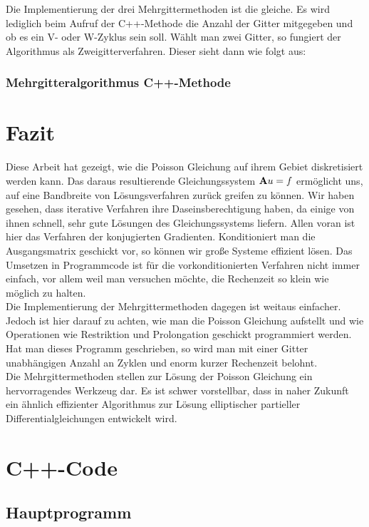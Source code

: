 Die Implementierung der drei Mehrgittermethoden ist die gleiche. Es wird lediglich beim Aufruf der C++-Methode die Anzahl der Gitter mitgegeben und ob es ein V- oder W-Zyklus sein soll. Wählt man zwei Gitter, so fungiert der Algorithmus als Zweigitterverfahren. Dieser sieht dann wie folgt aus:

\subsection{Mehrgitteralgorithmus C++-Methode}\label{s.mgm}

\chapter{Fazit}

Diese Arbeit hat gezeigt, wie die Poisson Gleichung auf ihrem Gebiet diskretisiert werden kann. Das daraus resultierende Gleichungssystem ${\textbf{A}} u = f$ ermöglicht uns, auf eine Bandbreite von Lösungsverfahren zurück greifen zu können. Wir haben gesehen, dass iterative Verfahren ihre Daseinsberechtigung haben, da einige von ihnen schnell, sehr gute Lösungen des Gleichungssystems liefern. Allen voran ist hier das Verfahren der konjugierten Gradienten. Konditioniert man die Ausgangsmatrix geschickt vor, so können wir große Systeme effizient lösen. Das Umsetzen in Programmcode ist für die vorkonditionierten Verfahren nicht immer einfach, vor allem weil man versuchen möchte, die Rechenzeit so klein wie möglich zu halten.\\
Die Implementierung der Mehrgittermethoden dagegen ist weitaus einfacher. Jedoch ist hier darauf zu achten, wie man die Poisson Gleichung aufstellt und wie Operationen wie Restriktion und Prolongation geschickt programmiert werden. Hat man dieses Programm geschrieben, so wird man mit einer Gitter unabhängigen Anzahl an Zyklen und enorm kurzer Rechenzeit belohnt.\\
Die Mehrgittermethoden stellen zur Lösung der Poisson Gleichung ein hervorragendes Werkzeug dar. Es ist schwer vorstellbar, dass in naher Zukunft ein ähnlich effizienter Algorithmus zur Lösung elliptischer partieller Differentialgleichungen entwickelt wird.

\chapter{C++-Code}
\section{Hauptprogramm}
